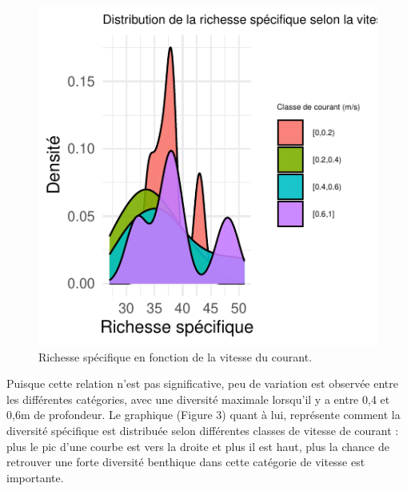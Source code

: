 \documentclass[9pt,twocolumn,twoside,final]{pnas-new}
\begin{document}
\begin{figure}[H]

{\centering \includegraphics{RMarkdown-article_files/figure-latex/fig_courant-1} 

}

\caption{Richesse spécifique en fonction de la vitesse du courant.}\label{fig:fig_courant}
\end{figure}

Puisque cette relation n'est pas significative, peu de variation est
observée entre les différentes catégories, avec une diversité maximale
lorsqu'il y a entre 0,4 et 0,6m de profondeur. Le graphique (Figure 3)
quant à lui, représente comment la diversité spécifique est distribuée
selon différentes classes de vitesse de courant : plus le pic d'une
courbe est vers la droite et plus il est haut, plus la chance de
retrouver une forte diversité benthique dans cette catégorie de vitesse
est importante.
\end{document}
